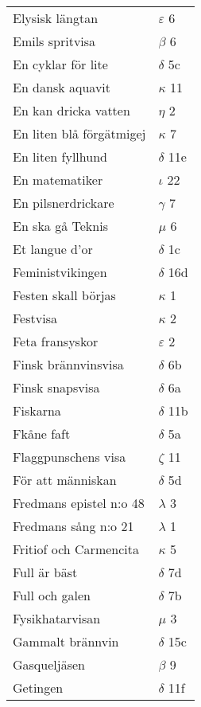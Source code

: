 \documentclass[a6paper,10pt]{article}
\begin{document}
\newpage
\setlength{\oddsidemargin}{-0.47in}
\begin{table}[!h]
\begin{tabular}{l l}
Elysisk längtan&$\varepsilon$ 6\\
Emils spritvisa&$\beta$ 6\\
En cyklar för lite&	$\delta$ 5c\\
En dansk aquavit&$\kappa$ 11\\
En kan dricka vatten&	$\eta$ 2\\
En liten blå förgätmigej&$\kappa$ 7\\
En liten fyllhund&$\delta$ 11e\\
En matematiker&$\iota$ 22\\
En pilsnerdrickare&$\gamma$ 7\\
En ska gå Teknis&	$\mu$ 6\\
Et langue d'or&$\delta$ 1c\\
Feministvikingen&$\delta$ 16d\\
Festen skall börjas&$\kappa$ 1\\
Festvisa&$\kappa$ 2\\
Feta fransyskor&$\varepsilon$ 2\\
Finsk brännvinsvisa&$\delta$ 6b\\
Finsk snapsvisa&$\delta$ 6a\\
Fiskarna&$\delta$ 11b\\
Fkåne faft&$\delta$ 5a\\
Flaggpunschens visa&$\zeta$ 11\\
För att människan&$\delta$ 5d\\
Fredmans epistel n:o 48	&$\lambda$ 3\\
Fredmans sång n:o 21&$\lambda$ 1\\
Fritiof och Carmencita&$\kappa$ 5\\
Full är bäst&$\delta$ 7d\\
Full och galen&$\delta$ 7b\\
Fysikhatarvisan&$\mu$ 3\\
Gammalt brännvin&$\delta$ 15c\\
Gasqueljäsen&$\beta$ 9\\
Getingen&$\delta$ 11f\\
\end{tabular}
\end{table}
\end{document}
